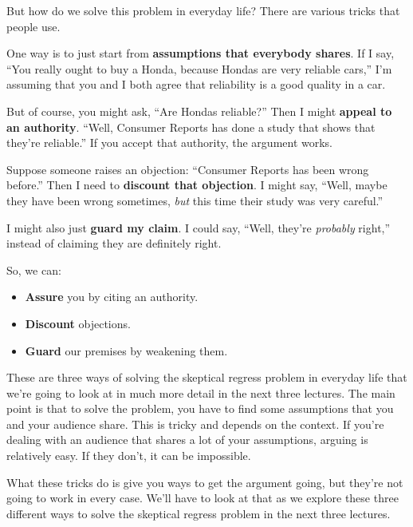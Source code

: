 \documentclass[12pt]{article}
\begin{document}
But how do we solve this problem in everyday life? There are various tricks that people use.

One way is to just start from \textbf{assumptions that everybody shares}. If I say, ``You really ought to buy a Honda, because Hondas are very reliable cars,'' I'm assuming that you and I both agree that reliability is a good quality in a car.

But of course, you might ask, ``Are Hondas reliable?'' Then I might \textbf{appeal to an authority}. ``Well, Consumer Reports has done a study that shows that they're reliable.'' If you accept that authority, the argument works.

Suppose someone raises an objection: ``Consumer Reports has been wrong before.'' Then I need to \textbf{discount that objection}. I might say, ``Well, maybe they have been wrong sometimes, \textit{but} this time their study was very careful.''

I might also just \textbf{guard my claim}. I could say, ``Well, they're \textit{probably} right,'' instead of claiming they are definitely right.

So, we can:
\begin{itemize}
    \item \textbf{Assure} you by citing an authority.
    \item \textbf{Discount} objections.
    \item \textbf{Guard} our premises by weakening them.
\end{itemize}

These are three ways of solving the skeptical regress problem in everyday life that we're going to look at in much more detail in the next three lectures. The main point is that to solve the problem, you have to find some assumptions that you and your audience share. This is tricky and depends on the context. If you're dealing with an audience that shares a lot of your assumptions, arguing is relatively easy. If they don't, it can be impossible.

What these tricks do is give you ways to get the argument going, but they're not going to work in every case. We'll have to look at that as we explore these three different ways to solve the skeptical regress problem in the next three lectures.
\end{document}

